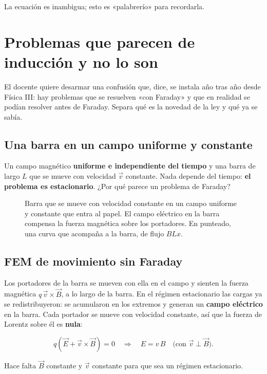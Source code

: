 \documentclass[12pt,a4paper]{article}
\begin{document}
La ecuación es inambigua; esto es «palabrerío» para recordarla.

\section{Problemas que parecen de inducción y no lo son}

El docente quiere desarmar una confusión que, dice, se instala año tras año
desde Física III: hay problemas que se resuelven «con Faraday» y que en
realidad se podían resolver antes de Faraday. Separa qué es la novedad de la
ley y qué ya se sabía.

\subsection{Una barra en un campo uniforme y constante}

Un campo magnético \textbf{uniforme e independiente del tiempo} y una barra de largo
$L$ que se mueve con velocidad $\vec v$ constante. Nada depende del tiempo:
\textbf{el problema es estacionario}. ¿Por qué parece un problema de Faraday?

\begin{figure}[H]
  \centering
  
  \caption{Barra que se mueve con velocidad constante en un campo uniforme y constante que entra al papel. El campo eléctrico en la barra compensa la fuerza magnética sobre los portadores. En punteado, una curva que acompaña a la barra, de flujo $B L x$.}
\end{figure}

\subsection{FEM de movimiento sin Faraday}

Los portadores de la barra se mueven con ella en el campo y sienten la fuerza
magnética $q\,\vec v\times\vec B$, a lo largo de la barra. En el régimen
estacionario las cargas ya se redistribuyeron: se acumularon en los extremos y
generan un \textbf{campo eléctrico} en la barra. Cada portador se mueve con
velocidad constante, así que la fuerza de Lorentz sobre él es \textbf{nula}:

\[
q\left(\vec E + \vec v\times\vec B\right) = 0
\quad\Longrightarrow\quad
E = v\,B \quad\text{(con } \vec v\perp\vec B\text{)}.
\]

\begin{notebox}
Hace falta $\vec B$ constante y $\vec v$ constante para que sea un régimen
estacionario.
\end{notebox}
\end{document}
